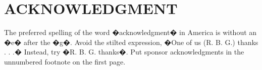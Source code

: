\documentclass[letterpaper, 10 pt, conference]{ieeeconf}  %
\begin{document}
\addtolength{\textheight}{-12cm}   %







\section*{ACKNOWLEDGMENT}

The preferred spelling of the word �acknowledgment� in America is without an �e� after the �g�. Avoid the stilted expression, �One of us (R. B. G.) thanks . . .�  Instead, try �R. B. G. thanks�. Put sponsor acknowledgments in the unnumbered footnote on the first page.





\end{document}
